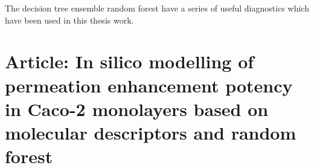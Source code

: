 The decision tree ensemble random forest have a series of useful diagnostics which have been used in this thesis work.

\section{Article: In silico modelling of permeation enhancement potency in Caco-2
monolayers based on molecular descriptors and random forest}

\newpage




